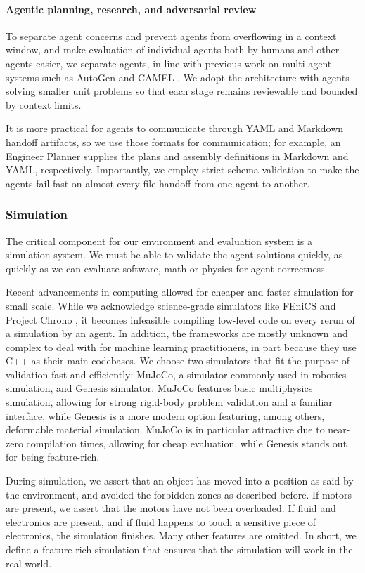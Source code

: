 \documentclass[conference]{IEEEtran}
\begin{document}
\paragraph{Agentic planning, research, and adversarial review}
To separate agent concerns and prevent agents from overflowing in a context window, and make evaluation of individual agents both by humans and other agents easier, we separate agents, in line with previous work on multi-agent systems such as AutoGen \cite{ref24} and CAMEL \cite{ref25}. We adopt the architecture with agents solving smaller unit problems so that each stage remains reviewable and bounded by context limits.

It is more practical for agents to communicate through YAML and Markdown handoff artifacts, so we use those formats for communication; for example, an Engineer Planner supplies the plans and assembly definitions in Markdown and YAML, respectively. Importantly, we employ strict schema validation to make the agents fail fast on almost every file handoff from one agent to another.

\subsubsection{Simulation}
The critical component for our environment and evaluation system is a simulation system. We must be able to validate the agent solutions quickly, as quickly as we can evaluate software, math or physics for agent correctness.

Recent advancements in computing allowed for cheaper and faster simulation for small scale. While we acknowledge science-grade simulators like FEniCS \cite{ref7} and Project Chrono \cite{ref8}, it becomes infeasible compiling low-level code on every rerun of a simulation by an agent. In addition, the frameworks are mostly unknown and complex to deal with for machine learning practitioners, in part because they use C++ as their main codebases. We choose two simulators that fit the purpose of validation fast and efficiently: MuJoCo, a simulator commonly used in robotics simulation, and Genesis simulator. MuJoCo features basic multiphysics simulation, allowing for strong rigid-body problem validation and a familiar interface, while Genesis is a more modern option featuring, among others, deformable material simulation. MuJoCo is in particular attractive due to near-zero compilation times, allowing for cheap evaluation, while Genesis stands out for being feature-rich.

During simulation, we assert that an object has moved into a position as said by the environment, and avoided the forbidden zones as described before. If motors are present, we assert that the motors have not been overloaded. If fluid and electronics are present, and if fluid happens to touch a sensitive piece of electronics, the simulation finishes. Many other features are omitted. In short, we define a feature-rich simulation that ensures that the simulation will work in the real world.
\end{document}
